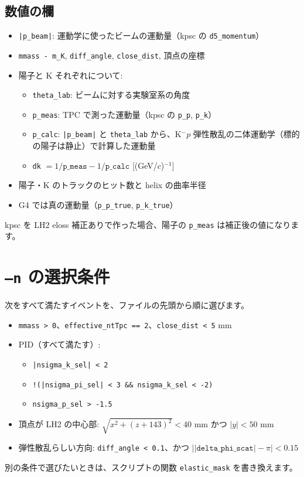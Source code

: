 \documentclass[a4paper,10pt]{ltjsarticle}
\begin{document}
\subsection{数値の欄}
\begin{itemize}
\item \texttt{|p\_beam|}: 運動学に使ったビームの運動量（kpsc の \texttt{d5\_momentum}）
\item \texttt{mmass - m\_K}, \texttt{diff\_angle}, \texttt{close\_dist}, 頂点の座標
\item 陽子と K それぞれについて:
  \begin{itemize}
  \item \texttt{theta\_lab}: ビームに対する実験室系の角度
  \item \texttt{p\_meas}: TPC で測った運動量（kpsc の \texttt{p\_p}, \texttt{p\_k}）
  \item \texttt{p\_calc}: \texttt{|p\_beam|} と \texttt{theta\_lab} から、K$^-p$ 弾性散乱の二体運動学（標的の陽子は静止）で計算した運動量
  \item \texttt{dk} $=1/\texttt{p\_meas}-1/\texttt{p\_calc}$ [(GeV/$c$)$^{-1}$]
  \end{itemize}
\item 陽子・K のトラックのヒット数と helix の曲率半径
\item G4 では真の運動量（\texttt{p\_p\_true}, \texttt{p\_k\_true}）
\end{itemize}
kpsc を LH2 eloss 補正ありで作った場合、陽子の \texttt{p\_meas} は補正後の値になります。

\section{\texttt{--n} の選択条件}\label{sec:sel}
次をすべて満たすイベントを、ファイルの先頭から順に選びます。
\begin{itemize}
\item \texttt{mmass > 0}、\texttt{effective\_ntTpc == 2}、\texttt{close\_dist < 5} mm
\item PID（すべて満たす）:
  \begin{itemize}
  \item \texttt{|nsigma\_k\_sel| < 2}
  \item \texttt{!(|nsigma\_pi\_sel| < 3 \&\& nsigma\_k\_sel < -2)}
  \item \texttt{nsigma\_p\_sel > -1.5}
  \end{itemize}
\item 頂点が LH2 の中心部: $\sqrt{x^2+(z+143)^2}<40$ mm かつ $|y|<50$ mm
\item 弾性散乱らしい方向: \texttt{diff\_angle < 0.1}、かつ $\bigl||\texttt{delta\_phi\_scat}|-\pi\bigr|<0.15$
\end{itemize}
別の条件で選びたいときは、スクリプトの関数 \texttt{elastic\_mask} を書き換えます。
\end{document}
